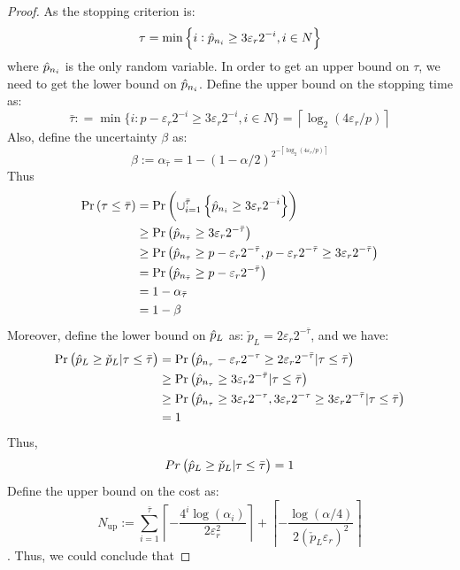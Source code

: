 \documentclass{iitthesis}
\begin{document}
\begin{proof}
As the stopping criterion is: $$\tau = \min\left\{i: \hat{p}_{n_i}\geq 3\varepsilon_r 2^{-i}, i \in N\right \}$$
where $\hat{p}_{n_i}$ is the only random variable. In order to get an upper bound on $\tau$, we need to get the lower bound on $\hat{p}_{n_i}$.
Define the upper bound on the stopping time as:
$$\bar{\tau}: = \min \{i:  p-\varepsilon_r2^{-i} \geq 3\varepsilon_r 2^{-i}, i \in N\} =\left \lceil \log_2 (4\varepsilon_r/p)\right \rceil$$
Also, define the uncertainty $\beta$ as:
$$\beta := \alpha_{\bar{\tau}}=1-(1-\alpha/2)^{2^{-\left \lceil \log_2 (4\varepsilon_r/p)\right \rceil}}$$
Thus 
\begin{align}
\Pr\left (\tau \leq \bar{\tau}\right) &= \Pr \left (\cup_{i=1}^{\bar{\tau}}\left \{\hat{p}_{n_i}\geq 3\varepsilon_r 2^{-i} \right \} \right) \\&
\geq \Pr\left( \hat{p}_{n_{\bar{\tau}}} \geq 3\varepsilon_r 2^{-\bar{\tau}}\right) \\&
\geq  \Pr \left( \hat{p}_{n_{\bar{\tau}}} \geq p-\varepsilon_r 2^{-\bar{\tau}} , p-\varepsilon_r 2^{-\bar{\tau}}  \geq 3 \varepsilon_r 2^{-\bar{\tau}}\right)\\&
= \Pr \left( \hat{p}_{n_{\bar{\tau}}} \geq p-\varepsilon_r 2^{-\bar{\tau}}\right) \\& =1-\alpha_{\bar{\tau}} \\& = 1-\beta
\end{align}
Moreover, define the lower bound on $\hat{p}_L$ as: $\check{p}_L = 2\varepsilon_r2^{-\bar{\tau}}$, and we have:
\begin{align}
\Pr\left(\hat{p}_L  \geq  \check{p}_L  | \tau \leq \bar{\tau}\right)& = \Pr\left(\hat{p}_{n_\tau} - \varepsilon_r 2^{-\tau}\geq 2\varepsilon_r2^{-\bar{\tau}}| \tau \leq \bar{\tau}\right)\\&\geq \Pr\left(\hat{p}_{n_{\tau}}\geq 3\varepsilon_r2^{-{\bar{\tau}}}| \tau \leq \bar{\tau}\right) \\& \geq 
\Pr\left(\hat{p}_{n_{\tau}}\geq 3\varepsilon_r2^{-{\tau}}, 3\varepsilon_r2^{-{\tau}} \geq 3\varepsilon_r2^{-{\bar{\tau}}} | \tau \leq \bar{\tau}\right)\\&
=1
\end{align}
Thus, $$Pr\left(\hat{p}_L \geq \check{p}_L | \tau \leq \bar{\tau}\right)=1$$
Define the upper bound on the cost as:  
$$N_{\text{up}}:= \sum_{i=1}^{\bar{\tau}} \left \lceil -\frac{4^i \log(\alpha_i)} {2\varepsilon_r^2 } \right\rceil+\left \lceil -\frac{\log (\alpha/4)}{2  (\check{p}_L \varepsilon_{r})^2} \right \rceil$$. Thus, we could conclude that

\end{proof}
\end{document}
